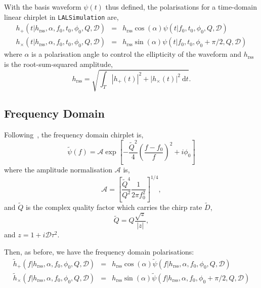\documentclass[11pt]{ligovirgodcc}
\begin{document}
With the basis waveform $\psi(t)$ thus defined, the polarisations for a
time-domain linear chirplet in {\tt LALSimulation} are,
\begin{eqnarray}
h_+(t|h_{\mathrm{rss}},\alpha,f_0,t_0,\phi_0,Q,\mathcal{D}) & = & h_{\mathrm{rss}} \cos (\alpha) \psi(t|f_0,t_0,\phi_0,Q,\mathcal{D}) \\
h_{\times}(t|h_{\mathrm{rss}},\alpha,f_0,t_0,\phi_0,Q,\mathcal{D}) & = &
h_{\mathrm{rss}} \sin (\alpha) \psi(t|f_0,t_0,\phi_0+\pi/2,Q,\mathcal{D}) 
\end{eqnarray}
%
where $\alpha$ is a polarisation angle to control the ellipticity of the
waveform and $h_{\mathrm{rss}}$ is the root-sum-squared amplitude,
\begin{equation}
h_{\mathrm{rss}} = \sqrt{\int_T |h_+(t)|^2 + |h_{\times}(t)|^2~\mathrm{d}t}.
\end{equation}
%
\subsection{Frequency Domain}
Following~\cite{2010CQGra..27s4017C}, the frequency domain chirplet is, 
\begin{equation}
\tilde{\psi}(f) = \mathcal{A} \exp \left[ - \frac{\tilde{Q}^2}{4}
\left(\frac{f-f_0}{f}\right)^2 + i\phi_0\right]
\end{equation}
%
where the amplitude normalisation $\mathcal{A}$ is,
\begin{equation}
{\mathcal A} = \left[ \frac{\tilde{Q}^4}{Q^2}\frac{1}{2\pi f_0^2} \right]^{1/4},
\end{equation}
%
and $\tilde{Q}$ is the complex quality factor which carries the chirp rate
$\tilde{D}$,
\begin{equation}
\tilde{Q} = Q\frac{\sqrt{z}}{|z|},
\end{equation}
%
and $z = 1 + i\mathcal{D} \tau^2$.

Then, as before, we have the frequency domain polarisations:
\begin{eqnarray}
\tilde{h}_+(f|h_{\mathrm{rss}},\alpha,f_0,\phi_0,Q,\mathcal{D}) & = &
h_{\mathrm{rss}} \cos (\alpha)
\tilde{\psi}(f|h_{\mathrm{rss}},\alpha,f_0,\phi_0,Q,\mathcal{D}) \\
\tilde{h}_{\times}(f|h_{\mathrm{rss}},\alpha,f_0,\phi_0,Q,\mathcal{D}) & = &
h_{\mathrm{rss}} \sin (\alpha)
\tilde{\psi}(f|h_{\mathrm{rss}},\alpha,f_0,\phi_0+\pi/2,Q,\mathcal{D}) 
\end{eqnarray}




\end{document}
